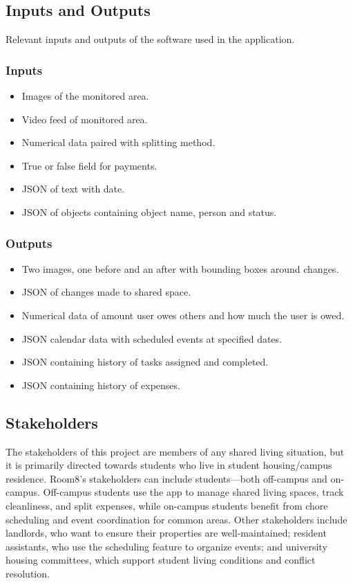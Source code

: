\documentclass[12pt, titlepage]{article}
\begin{document}
\subsection{Inputs and Outputs}
Relevant inputs and outputs of the software used in the application.
\subsubsection{Inputs}
\begin{itemize}
\item Images of the monitored area.
\item Video feed of monitored area.
\item Numerical data paired with splitting method.
\item True or false field for payments.
\item JSON of text with date.
\item JSON of objects containing object name, person and status.
\end{itemize}
\subsubsection{Outputs}
\begin{itemize}
\item Two images, one before and an after with bounding boxes around changes.
\item JSON of changes made to shared space.
\item Numerical data of amount user owes others and how much the user is owed.
\item JSON calendar data with scheduled events at specified dates.
\item JSON containing history of tasks assigned and completed.
\item JSON containing history of expenses.
\end{itemize}
\subsection{Stakeholders}
The stakeholders of this project are members of any shared living situation, but it is primarily directed towards students who live in student housing/campus residence. Room8’s stakeholders can include students—both off-campus and on-campus. Off-campus students use the app to manage shared living spaces, track cleanliness, and split expenses, while on-campus students benefit from chore scheduling and event coordination for common areas. Other stakeholders include landlords, who want to ensure their properties are well-maintained; resident assistants, who use the scheduling feature to organize events; and university housing committees, which support student living conditions and conflict resolution.
\end{document}
